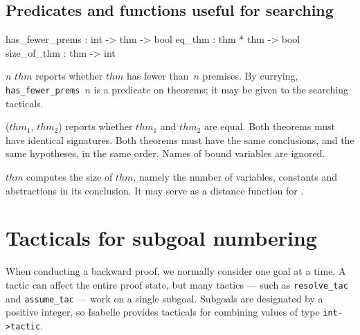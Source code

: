 \subsection{Predicates and functions useful for searching}
\begin{ttbox} 
has_fewer_prems : int -> thm -> bool
eq_thm          : thm * thm -> bool
size_of_thm     : thm -> int
\end{ttbox}
\begin{ttdescription}
\item[\ttindexbold{has_fewer_prems} $n$ $thm$] 
reports whether $thm$ has fewer than~$n$ premises.  By currying,
\hbox{\tt has_fewer_prems $n$} is a predicate on theorems; it may 
be given to the searching tacticals.

\item[\ttindexbold{eq_thm} ($thm_1$, $thm_2$)] reports whether $thm_1$
  and $thm_2$ are equal.  Both theorems must have identical
  signatures.  Both theorems must have the same conclusions, and the
  same hypotheses, in the same order.  Names of bound variables are
  ignored.

\item[\ttindexbold{size_of_thm} $thm$] 
computes the size of $thm$, namely the number of variables, constants and
abstractions in its conclusion.  It may serve as a distance function for 
. 
\end{ttdescription}



\section{Tacticals for subgoal numbering}
When conducting a backward proof, we normally consider one goal at a time.
A tactic can affect the entire proof state, but many tactics --- such as
{\tt resolve_tac} and {\tt assume_tac} --- work on a single subgoal.
Subgoals are designated by a positive integer, so Isabelle provides
tacticals for combining values of type {\tt int->tactic}.


